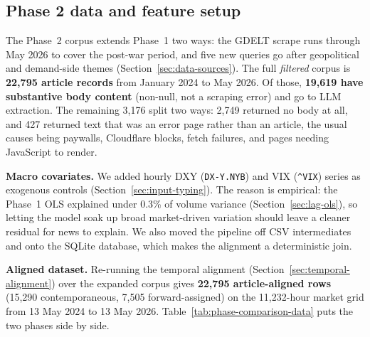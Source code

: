 \subsection{Phase 2 data and feature setup}\label{sec:phase2-data}

The Phase~2 corpus extends Phase~1 two ways: the GDELT scrape runs through May 2026 to cover the post-war period, and five new queries go after geopolitical and demand-side themes (Section~\ref{sec:data-sources}). The full \emph{filtered} corpus is \textbf{22{,}795 article records} from January 2024 to May 2026. Of those, \textbf{19{,}619 have substantive body content} (non-null, not a scraping error) and go to LLM extraction. The remaining 3{,}176 split two ways: 2{,}749 returned no body at all, and 427 returned text that was an error page rather than an article, the usual causes being paywalls, Cloudflare blocks, fetch failures, and pages needing JavaScript to render.

\textbf{Macro covariates.} We added hourly DXY (\texttt{DX-Y.NYB}) and VIX (\texttt{\^{}VIX}) series as exogenous controls (Section~\ref{sec:input-typing}). The reason is empirical: the Phase~1 OLS explained under 0.3\% of volume variance (Section~\ref{sec:lag-ols}), so letting the model soak up broad market-driven variation should leave a cleaner residual for news to explain. We also moved the pipeline off CSV intermediates and onto the SQLite database, which makes the alignment a deterministic join.

\textbf{Aligned dataset.} Re-running the temporal alignment (Section~\ref{sec:temporal-alignment}) over the expanded corpus gives \textbf{22{,}795 article-aligned rows} (15{,}290 contemporaneous, 7{,}505 forward-assigned) on the 11{,}232-hour market grid from 13 May 2024 to 13 May 2026. Table~\ref{tab:phase-comparison-data} puts the two phases side by side.

